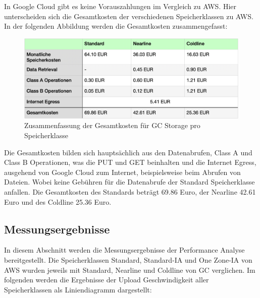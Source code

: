 \newpage        

In Google Cloud gibt es keine Vorauszahlungen im Vergleich zu AWS. Hier unterscheiden sich die Gesamtkosten der verschiedenen Speicherklassen zu AWS. In der folgenden Abbildung werden die Gesamtkosten zusammengefasst:

\begin{figure}[h]
	\centering
	\includegraphics[width=13cm,keepaspectratio]{Pictures/GCgesamtkosten.png}
	\caption{Zusammenfassung der Gesamtkosten für GC Storage pro Speicherklasse}
\end{figure}

Die Gesamtkosten bilden sich hauptsächlich aus den Datenabrufen, Class A und Class B Operationen, was die PUT und GET beinhalten und die Internet Egress, ausgehend von Google Cloud zum Internet, beispielsweise beim Abrufen von Dateien. Wobei keine Gebühren für die Datenabrufe der Standard Speicherklasse anfallen. Die Gesamtkosten des Standards beträgt 69.86 Euro, der Nearline 42.61 Euro und des Coldline 25.36 Euro. 

\newpage
\subsection{Messungsergebnisse}

In diesem Abschnitt werden die Messungsergebnisse der Performance Analyse bereitgestellt. Die Speicherklassen Standard, Standard-IA und One Zone-IA von AWS wurden jeweils mit Standard, Nearline und Coldline von GC verglichen. Im folgenden werden die Ergebnisse der Upload Geschwindigkeit aller Speicherklassen als Liniendiagramm dargestellt:

